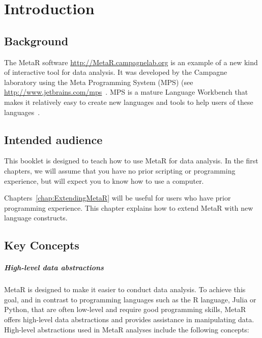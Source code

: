 


\chapter{Introduction}\label{chap:Introduction}
\section{Background}
The MetaR software \url{http://MetaR.campagnelab.org} is an example of a new kind of interactive tool for data analysis. It was developed by the Campagne laboratory using the Meta Programming System (MPS) (see \url{http://www.jetbrains.com/mps}~\cite{Dmitriev:2004}. MPS is a mature Language Workbench that makes it relatively easy to create new languages and tools to help users of these languages~\cite{campagne2014mps}. 

\section{Intended audience}
This booklet is designed to teach how to use MetaR for data analysis. In the first chapters, we will assume that you have no prior scripting or programming experience, but will expect you to know how to use a computer.

Chapters~\ref{chap:ExtendingMetaR} will be useful for users who  have prior programming experience. This chapter explains how to extend MetaR with new language constructs.

\section{Key Concepts}
\paragraph{High-level data abstractions}
MetaR is designed to make it easier to conduct data analysis. To achieve this goal, and in contrast to programming languages such as the R language, Julia or Python, that are often low-level and require good programming skills, MetaR offers high-level data abstractions and provides assistance in manipulating data. High-level abstractions used in MetaR analyses include the following concepts:

